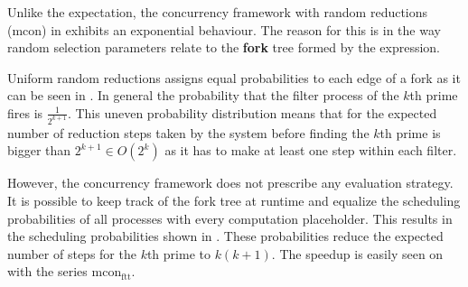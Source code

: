 \documentclass[12pt,twoside,notitlepage]{report}
\begin{document}
Unlike the expectation, the concurrency framework with random reductions (mcon) in  exhibits an exponential behaviour. The reason for this is in the way random selection parameters relate to the \textbf{fork} tree formed by the expression.

Uniform random reductions assigns equal probabilities to each edge of a fork as it can be seen in . In general the probability that the filter process of the $ k $th prime fires is $ \frac{1}{2^{k+1}} $. This uneven probability distribution means that for the expected number of reduction steps taken by the system before finding the $ k $th prime is bigger than $ 2^{k+1} \in O(2^{k}) $ as it has to make at least one step within each filter.

However, the concurrency framework does not prescribe any evaluation strategy. It is possible to keep track of the fork tree at runtime and equalize the scheduling probabilities of all processes with every computation placeholder. This results in the scheduling probabilities shown in . These probabilities reduce the expected number of steps for the $ k $th prime to $ k(k+1) $. The speedup is easily seen on  with the series $ \text{mcon}_{\text{ftt}} $.
\end{document}
